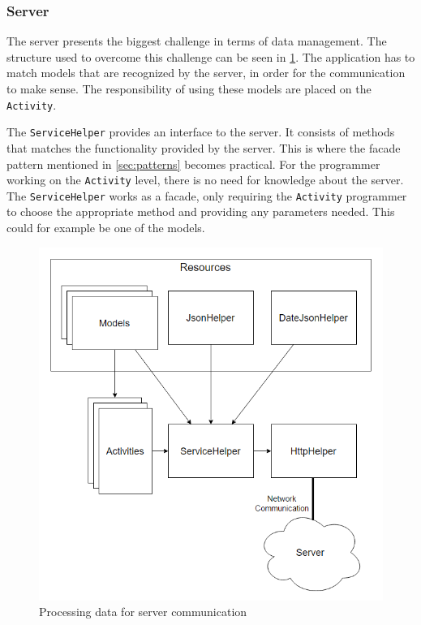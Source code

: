 \subsubsection{Server}
\label{subsubsec:server}
The server presents the biggest challenge in terms of data management. The structure used to overcome this challenge can be seen in \ref{fig:application_dataflow}. The application has to match models that are recognized by the server, in order for the communication to make sense. The responsibility of using these models are placed on the \texttt{Activity}.

The \texttt{ServiceHelper} provides an interface to the server. It consists of methods that matches the functionality provided by the server. This is where the facade pattern mentioned in \ref{sec:patterns} becomes practical. For the programmer working on the \texttt{Activity} level, there is no need for knowledge about the server. The \texttt{ServiceHelper} works as a facade, only requiring the \texttt{Activity} programmer to choose the appropriate method and providing any parameters needed. This could for example be one of the models.

\begin{figure}[H]
	\centering
	\includegraphics[width=\textwidth]{Pictures/application_dataflow.png}
	\caption{Processing data for server communication}
	\label{fig:application_dataflow}
\end{figure}

